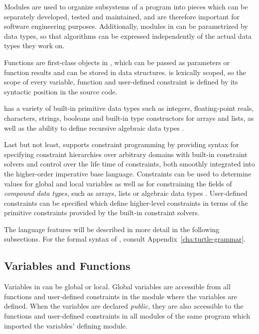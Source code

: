 Modules are used to organize subsystems of a program into pieces which
can be separately developed, tested and maintained, and are therefore
important for software engineering purposes.  Additionally, modules in
\turtle{} can be parametrized by data types, so that algorithms can be
expressed independently of the actual data types they work on.

Functions are first-class objects in \turtle{}, which can be passed as
parameters or function results and can be stored in data structures.
\turtle{} is lexically scoped, so the scope of every variable,
function and user-defined constraint is defined by its syntactic
position in the source code.

\turtle{} has a variety of built-in primitive data types such as
integers, floating-point reals, characters, strings, booleans and
built-in type constructors for arrays and lists, as well as the
ability to define recursive algebraic data types%
.

Last but not least, \turtle{} supports constraint programming by
providing syntax for specifying constraint hierarchies over arbitrary
domains with built-in constraint solvers and control over the life
time of constraints, both smoothly integrated into the higher-order
imperative base language.  Constraints can be used to determine values
for global and local variables as well as for constraining the fields
of {\em compound data types}, %
%
such as arrays, lists or algebraic data types%
.  User-defined constraints can be
specified which define higher-level constraints in terms of the
primitive constraints provided by the built-in constraint solvers.

The language features will be described in more detail in the
following subsections.  For the formal syntax of \turtle{}, consult
Appendix~\ref{cha:turtle-grammar}.

\subsection{Variables and Functions}


Variables in \turtle{} can be global or local.  Global variables are
accessible from all functions and user-defined constraints in the module
where the variables are defined.  When the variables are declared {\em
  public}, they are also accessible to the functions and user-defined
constraints in all modules of the same program which imported the
variables' defining module.


